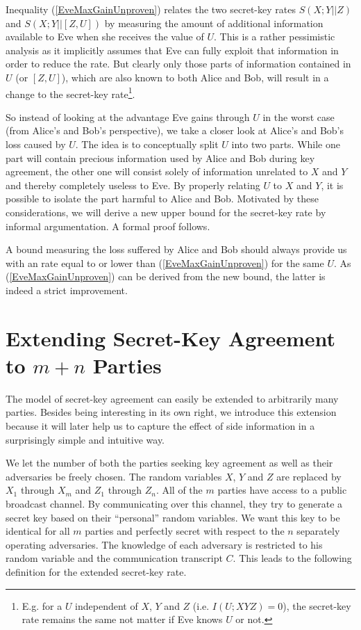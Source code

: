 \documentclass[a4paper, twoside, openany]{report}
\theoremstyle{plain}
\theoremstyle{definition}
\begin{document}
Inequality (\ref{EveMaxGainUnproven}) relates the two secret-key rates $S(X;Y||Z)$ and $S(X;Y||[Z,U])$ by measuring the amount of additional information available to Eve when she receives the value of $U$. This is a rather pessimistic analysis as it implicitly assumes that Eve can fully exploit that information in order to reduce the rate. But clearly only those parts of information contained in $U$ (or $[Z,U]$), which are also known to both Alice and Bob, will result in a change to the secret-key rate\footnote{E.g. for a $U$ independent of $X$, $Y$ and $Z$ (i.e. $I(U;XYZ) = 0$), the secret-key rate remains the same not matter if Eve knows $U$ or not.}.

So instead of looking at the advantage Eve gains through $U$ in the worst case (from Alice's and Bob's perspective), we take a closer look at Alice's and Bob's loss caused by $U$. The idea is to conceptually split $U$ into two parts. While one part will contain precious information used by Alice and Bob during key agreement, the other one will consist solely of information unrelated to $X$ and $Y$ and thereby completely useless to Eve. By properly relating $U$ to $X$ and $Y$, it is possible to isolate the part harmful to Alice and Bob.
Motivated by these considerations, we will derive a new upper bound for the secret-key rate by informal argumentation. A formal proof follows.

A bound measuring the loss suffered by Alice and Bob should always provide us with an rate equal to or lower than (\ref{EveMaxGainUnproven}) for the same $U$. As (\ref{EveMaxGainUnproven}) can be derived from the new bound, the latter is indeed a strict improvement.


\section{Extending Secret-Key Agreement to $m+n$ Parties}

The model of secret-key agreement can easily be extended to arbitrarily many parties. Besides being interesting in its own right, we introduce this extension because it will later help us to capture the effect of side information in a surprisingly simple and intuitive way.

We let the number of both the parties seeking key agreement as well as their adversaries be freely chosen. The random variables $X$, $Y$ and $Z$ are replaced by $X_1$ through $X_m$ and $Z_1$ through $Z_n$. All of the $m$ parties have access to a public broadcast channel. By communicating over this channel, they try to generate a secret key based on their ``personal'' random variables. We want this key to be identical for all $m$ parties and perfectly secret with respect to the $n$ separately operating adversaries. The knowledge of each adversary is restricted to his random variable and the communication transcript $C$. This leads to the following definition for the extended secret-key rate.
\end{document}
